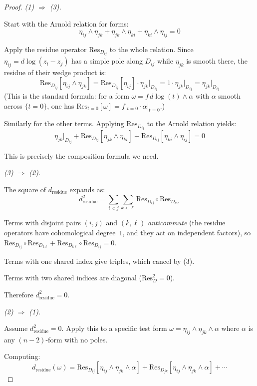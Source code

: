 \begin{proof}
\emph{(1) $\Rightarrow$ (3).}

Start with the Arnold relation for forms:
\[\eta_{ij} \wedge \eta_{jk} + \eta_{jk} \wedge \eta_{ki} + \eta_{ki} \wedge \eta_{ij} = 0\]

Apply the residue operator $\text{Res}_{D_{ij}}$ to the whole relation. Since $\eta_{ij} = d\log(z_i - z_j)$ has a simple pole along $D_{ij}$ while $\eta_{jk}$ is smooth there, the residue of their wedge product is:
\[\text{Res}_{D_{ij}}[\eta_{ij} \wedge \eta_{jk}] = \text{Res}_{D_{ij}}[\eta_{ij}] \cdot \eta_{jk}\big|_{D_{ij}} = 1 \cdot \eta_{jk}\big|_{D_{ij}} = \eta_{jk}\big|_{D_{ij}}\]
(This is the standard formula: for a form $\omega = f\,d\log(t) \wedge \alpha$ with $\alpha$ smooth across $\{t=0\}$, one has $\text{Res}_{t=0}[\omega] = f|_{t=0} \cdot \alpha|_{t=0}$.)

Similarly for the other terms. Applying $\text{Res}_{D_{ij}}$ to the Arnold relation yields:
\[\eta_{jk}|_{D_{ij}} + \text{Res}_{D_{ij}}[\eta_{jk} \wedge \eta_{ki}] + 
\text{Res}_{D_{ij}}[\eta_{ki} \wedge \eta_{ij}] = 0\]

This is precisely the composition formula we need.

\emph{(3) $\Rightarrow$ (2).}

The square of $d_{\text{residue}}$ expands as:
\[d_{\text{residue}}^2 = \sum_{i<j} \sum_{k<\ell} \text{Res}_{D_{ij}} \circ \text{Res}_{D_{k\ell}}\]

Terms with disjoint pairs $(i,j)$ and $(k,\ell)$ \emph{anticommute} (the residue operators have cohomological degree~$1$, and they act on independent factors), so $\text{Res}_{D_{ij}} \circ \text{Res}_{D_{k\ell}} + \text{Res}_{D_{k\ell}} \circ \text{Res}_{D_{ij}} = 0$.

Terms with one shared index give triples, which cancel by (3).

Terms with two shared indices are diagonal ($\text{Res}_D^2 = 0$).

Therefore $d_{\text{residue}}^2 = 0$.

\emph{(2) $\Rightarrow$ (1).}

Assume $d_{\text{residue}}^2 = 0$. Apply this to a specific test form
$\omega = \eta_{ij} \wedge \eta_{jk} \wedge \alpha$ where $\alpha$ is any $(n-2)$-form
with no poles.

Computing:
\[d_{\text{residue}}(\omega) = \text{Res}_{D_{ij}}[\eta_{ij} \wedge \eta_{jk} \wedge \alpha]
+ \text{Res}_{D_{jk}}[\eta_{ij} \wedge \eta_{jk} \wedge \alpha] + \cdots\]


\end{proof}
